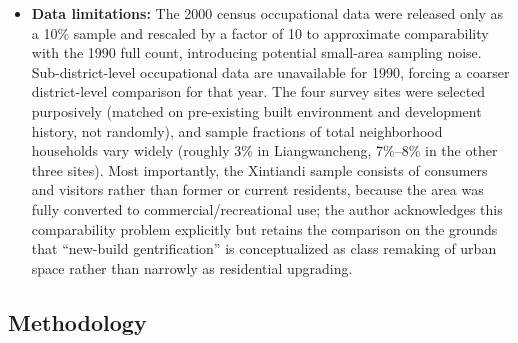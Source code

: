 \begin{itemize}
  \item \textbf{Data limitations:} The 2000 census occupational data were released only as a 10\% sample and rescaled by a factor of 10 to approximate comparability with the 1990 full count, introducing potential small-area sampling noise. Sub-district-level occupational data are unavailable for 1990, forcing a coarser district-level comparison for that year. The four survey sites were selected purposively (matched on pre-existing built environment and development history, not randomly), and sample fractions of total neighborhood households vary widely (roughly 3\% in Liangwancheng, 7\%--8\% in the other three sites). Most importantly, the Xintiandi sample consists of consumers and visitors rather than former or current residents, because the area was fully converted to commercial/recreational use; the author acknowledges this comparability problem explicitly but retains the comparison on the grounds that ``new-build gentrification'' is conceptualized as class remaking of urban space rather than narrowly as residential upgrading.
\end{itemize}

\subsection*{Methodology}

